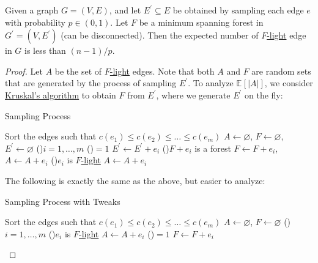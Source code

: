 \begin{lemma}\label{lma:sampling}
	Given a graph \(G=(V, E)\), and let \(E^{\prime} \subseteq E\) be obtained by sampling each edge \(e\) with probability \(p \in (0, 1)\). Let \(F\) be a minimum spanning forest in \(G^{\prime} = (V, E^{\prime}) \) (can be disconnected). Then the expected number of \hyperref[def:light]{\(F\)-light} edge in \(G\) is less than \((n-1) / p\).
\end{lemma}
\begin{proof}
	Let \(A\) be the set of \hyperref[def:light]{\(F\)-light} edges. Note that both \(A\) and \(F\) are random sets that are generated by the process of sampling \(E^{\prime} \). To analyze \(\mathbb{E}_{}[\lvert A \rvert ] \), we consider \hyperref[algo:Kruskal]{Kruskal's algorithm} to obtain \(F\) from \(E^{\prime} \), where we generate \(E^{\prime} \) on the fly:

	\begin{algorithm}[H]
		\DontPrintSemicolon{}
		\caption{Sampling Process}
		\BlankLine

		Sort the edges such that \(c(e_1) \leq c(e_2) \leq \dots \leq c(e_m)\)\;
		\(A \gets \varnothing \), \(F \gets \varnothing \), \(E^{\prime} \gets \varnothing \)\;
		\For(){\(i = 1, \dots , m\)}{
			\uIf(){\(= 1\)}{
				\(E^{\prime} \gets E^{\prime} + e_i\)\;
				\If(){\(F + e_i\) is a forest}{
					\(F \gets F + e_i\), \(A \gets A + e_i\)\;
				}
			}
			\ElseIf(){\(e_i\) is \hyperref[def:light]{\(F\)-light}}{
				\(A \gets A + e_i\)\;
			}
		}
		\;
	\end{algorithm}

	The following is exactly the same as the above, but easier to analyze:

	\begin{algorithm}[H]
		\DontPrintSemicolon{}
		\caption{Sampling Process with Tweaks}
		\BlankLine

		Sort the edges such that \(c(e_1) \leq c(e_2) \leq \dots \leq c(e_m)\)\;
		\(A \gets \varnothing \), \(F \gets \varnothing \)\;
		\For(){\(i = 1, \dots , m\)}{
			\If(){\(e_i\) is \hyperref[def:light]{\(F\)-light}}{
				\(A \gets A + e_i\)\;
				\If(){\(= 1\)}{
					\(F \gets F + e_i\)\;
				}
			}
		}
		\;
	\end{algorithm}


\end{proof}
